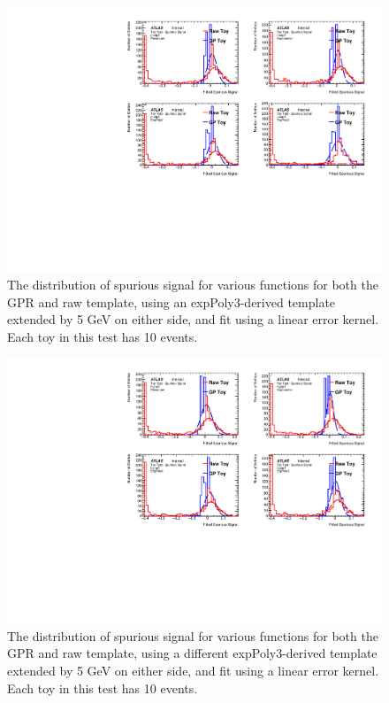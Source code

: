 \begin{figure} 
\begin{center}
  \includegraphics[width=\textwidth]{figures/background/gpr/validation/linear/ToyTest_FitSigVals_medpT_10_noSig}   
\caption{The distribution of spurious signal for various functions for both the GPR and raw template, using an expPoly3-derived template extended by 5 GeV on either side, and fit using a linear error kernel. Each toy in this test has 10 events.}
\label{fig:linearkernel_medpt_10_noSig}
\end{center}
\end{figure}

\begin{figure} 
\begin{center}
  \includegraphics[width=\textwidth]{figures/background/gpr/validation/linear/ToyTest_FitSigVals_highpT_10_noSig}   
\caption{The distribution of spurious signal for various functions for both the GPR and raw template, using a different expPoly3-derived template extended by 5 GeV on either side, and fit using a linear error kernel. Each toy in this test has 10 events.}
\label{fig:linearkernel_highpt_10_noSig}
\end{center}
\end{figure}

